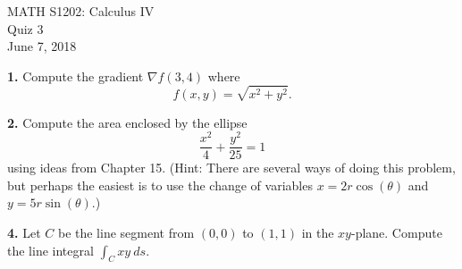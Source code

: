 \documentclass{article}
\begin{document}
\begin{center}
MATH S1202: Calculus IV \\ 
Quiz 3 \\
June 7, 2018
\end{center}


\noindent \textbf{1.} Compute the gradient $\nabla f(3,4)$ where 
\[
f(x,y) = \sqrt{x^2 + y^2}.
\]

\vspace{3mm}

\noindent \textbf{2.} Compute the area enclosed by the ellipse 
\[
\frac{x^2}{4} + \frac{y^2}{25} = 1
\]
using ideas from Chapter 15. (Hint: There are several ways of doing this problem, but perhaps the easiest is to use the change of variables $x = 2 r \cos(\theta)$ and $y = 5 r \sin(\theta)$.)

\vspace{3mm}

\noindent \textbf{4.} Let $C$ be the line segment from $(0,0)$ to $(1,1)$ in the $xy$-plane. Compute the line integral $\int_C xy \: ds$. 
\end{document}
